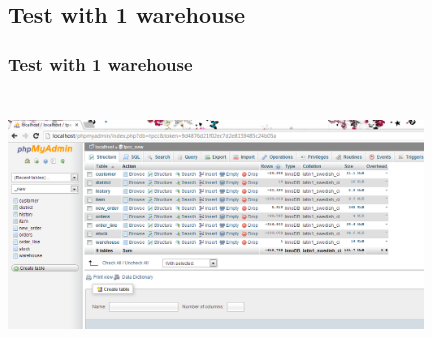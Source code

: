 \documentclass[12pt]{beamer}
\begin{document}
\subsection{Test with 1 warehouse}
\begin{frame}[c]
\frametitle{Test with 1 warehouse}
\centering
   \includegraphics[width=11cm, height=7cm]{images/warehouse1}

\end{frame}

\end{document}
